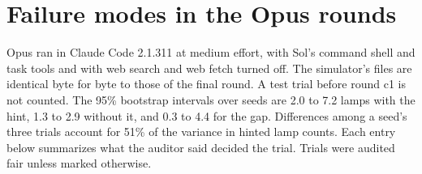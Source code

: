 \documentclass[10pt]{article}
\begin{document}
\section{Failure modes in the Opus rounds}
\label{app:claude}

Opus ran in Claude Code 2.1.311 at medium effort, with Sol's command shell and task tools and with web search and web fetch
turned off. The simulator's files are identical byte for byte to those of the final round. A test trial before round c1 is not
counted. The 95\% bootstrap intervals over seeds are 2.0 to 7.2 lamps with the hint, 1.3 to 2.9 without it, and 0.3 to 4.4 for the
gap. Differences among a seed's three trials account for 51\% of the variance in hinted lamp counts. Each entry below summarizes what the
auditor said decided the trial. Trials were audited fair unless marked otherwise.
\end{document}
